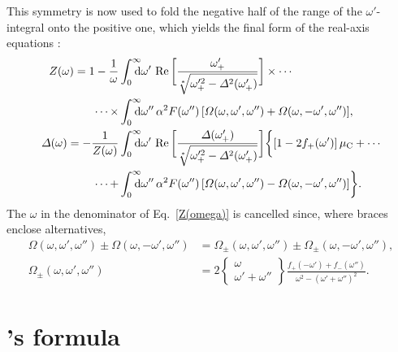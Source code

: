 This symmetry is now used to fold the negative half of the range of the
$\omega'$-integral onto the positive one, which yields the final form of the
real-axis  equations \cite[Eqs.~2, 3]{ScalapinoWadaSwihart65}:
%
\begin{subequations} \label{real-axis Eliashberg equations}
    \begin{align} \notag
        Z(\omega) = 1 - \frac 1 \omega
        &\int \from 0 \till \infty \D \omega' \,
        \Re \bigg[
            \frac{\omega'_+}{\sqrt[*]{\omega'^2_+ - \Delta^2(\omega'_+)}}
        \bigg]
        \times \cdots
        \\ \label{Z(omega)}
        \cdots \times
        &\int \from 0 \till \infty \D \omega'' \, \alpha^2 F(\omega'') \,
        [ \Omega(\omega,  \omega', \omega'')
        + \Omega(\omega, -\omega', \omega'') ],
        \\ \notag
        \Delta(\omega) = -\frac 1 {Z(\omega)}
        &\int \from 0 \till \infty \D \omega' \,
        \Re \bigg[ \frac
            {\Delta(\omega'_+)}
            {\sqrt[*]{\omega'^2_+ - \Delta^2(\omega'_+)}}
        \bigg]
        \bigg \{
            [1 - 2 f_+(\omega')] \, \mu \sub C
            + \cdots
            \\
            \cdots +
            &\int \from 0 \till \infty \D \omega'' \, \alpha^2 F(\omega'') \,
            [ \Omega(\omega,  \omega', \omega'')
            - \Omega(\omega, -\omega', \omega'') ]
        \bigg \}.
    \end{align}
\end{subequations}
%
The $\omega$ in the denominator of Eq.~\ref{Z(omega)} is cancelled since, where
braces enclose alternatives,
%
\begin{align*}
    \Omega    (\omega,  \omega', \omega'') \pm
    \Omega    (\omega, -\omega', \omega'') &=
    \Omega_\pm(\omega,  \omega', \omega'') \pm
    \Omega_\pm(\omega, -\omega', \omega''),
    \\
    \Omega_\pm(\omega,  \omega', \omega'') &=
    2 \begin{Bmatrix} \omega \\ \omega' + \omega'' \end{Bmatrix}
    \frac{f_+(-\omega') + f_-(\omega'')}{\omega^2 -(\omega' + \omega'')^2}.
\end{align*}

\section{'s formula}

